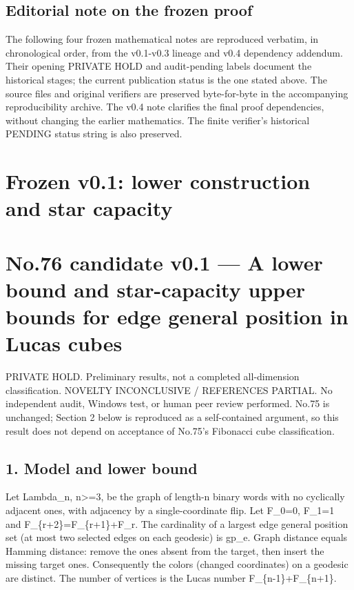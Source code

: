 \documentclass[
  10pt,
]{article}
\begin{document}
\subsection{Editorial note on the frozen
proof}\label{editorial-note-on-the-frozen-proof}

The following four frozen mathematical notes are reproduced verbatim, in
chronological order, from the v0.1-v0.3 lineage and v0.4 dependency
addendum. Their opening PRIVATE HOLD and audit-pending labels document
the historical stages; the current publication status is the one stated
above. The source files and original verifiers are preserved
byte-for-byte in the accompanying reproducibility archive. The v0.4 note
clarifies the final proof dependencies, without changing the earlier
mathematics. The finite verifier's historical PENDING status string is
also preserved.

\newpage

\section{Frozen v0.1: lower construction and star
capacity}\label{frozen-v0.1-lower-construction-and-star-capacity}

\section{No.76 candidate v0.1 --- A lower bound and star-capacity upper
bounds for edge general position in Lucas
cubes}\label{no.76-candidate-v0.1-a-lower-bound-and-star-capacity-upper-bounds-for-edge-general-position-in-lucas-cubes}

PRIVATE HOLD. Preliminary results, not a completed all-dimension
classification. NOVELTY INCONCLUSIVE / REFERENCES PARTIAL. No
independent audit, Windows test, or human peer review performed. No.75
is unchanged; Section 2 below is reproduced as a self-contained
argument, so this result does not depend on acceptance of No.75's
Fibonacci cube classification.

\subsection{1. Model and lower bound}\label{model-and-lower-bound}

Let Lambda\_n, n\textgreater=3, be the graph of length-n binary words
with no cyclically adjacent ones, with adjacency by a single-coordinate
flip. Let F\_0=0, F\_1=1 and F\_\{r+2\}=F\_\{r+1\}+F\_r. The cardinality
of a largest edge general position set (at most two selected edges on
each geodesic) is gp\_e. Graph distance equals Hamming distance: remove
the ones absent from the target, then insert the missing target ones.
Consequently the colors (changed coordinates) on a geodesic are
distinct. The number of vertices is the Lucas number
F\_\{n-1\}+F\_\{n+1\}.
\end{document}
